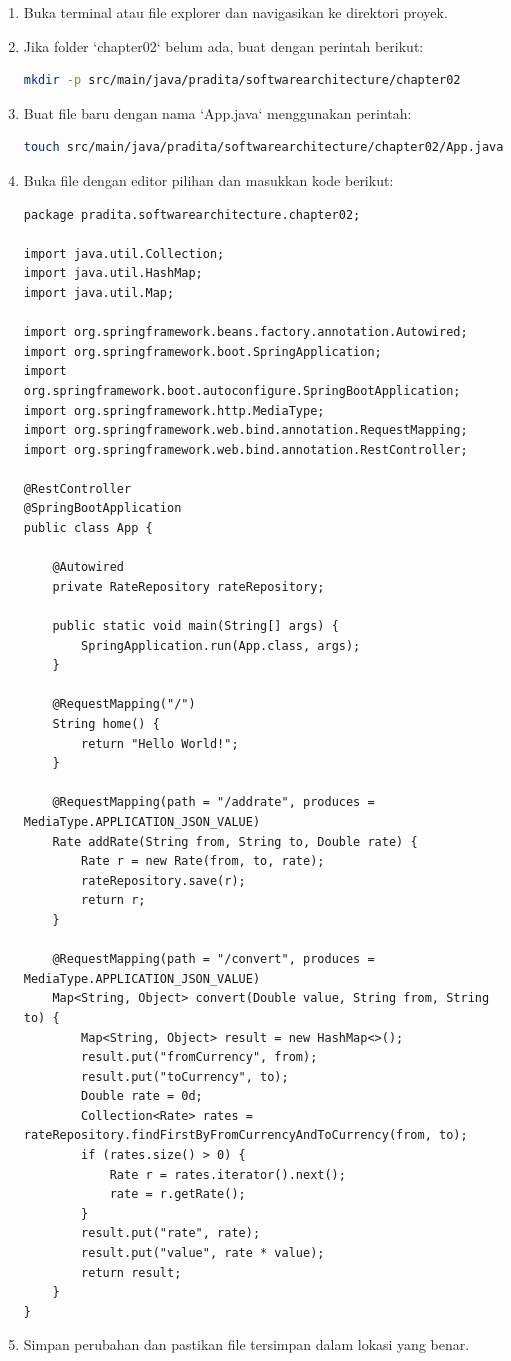 \begin{enumerate}
\item Buka terminal atau file explorer dan navigasikan ke direktori proyek.
\item Jika folder `chapter02` belum ada, buat dengan perintah berikut:

\begin{lstlisting}[language=bash]
mkdir -p src/main/java/pradita/softwarearchitecture/chapter02
\end{lstlisting}

\item Buat file baru dengan nama `App.java` menggunakan perintah:

\begin{lstlisting}[language=bash]
touch src/main/java/pradita/softwarearchitecture/chapter02/App.java
\end{lstlisting}

\item Buka file dengan editor pilihan dan masukkan kode berikut:

\begin{lstlisting}[style=JavaStyle]
package pradita.softwarearchitecture.chapter02;

import java.util.Collection;
import java.util.HashMap;
import java.util.Map;

import org.springframework.beans.factory.annotation.Autowired;
import org.springframework.boot.SpringApplication;
import org.springframework.boot.autoconfigure.SpringBootApplication;
import org.springframework.http.MediaType;
import org.springframework.web.bind.annotation.RequestMapping;
import org.springframework.web.bind.annotation.RestController;

@RestController
@SpringBootApplication
public class App {
	
	@Autowired
	private RateRepository rateRepository;
	
	public static void main(String[] args) {
		SpringApplication.run(App.class, args);
	}
	
	@RequestMapping("/")
	String home() {
		return "Hello World!";
	}
	
	@RequestMapping(path = "/addrate", produces = MediaType.APPLICATION_JSON_VALUE)
	Rate addRate(String from, String to, Double rate) {
		Rate r = new Rate(from, to, rate);
		rateRepository.save(r);
		return r;
	}
	
	@RequestMapping(path = "/convert", produces = MediaType.APPLICATION_JSON_VALUE)
	Map<String, Object> convert(Double value, String from, String to) {
		Map<String, Object> result = new HashMap<>();
		result.put("fromCurrency", from);
		result.put("toCurrency", to);
		Double rate = 0d;
		Collection<Rate> rates = rateRepository.findFirstByFromCurrencyAndToCurrency(from, to);
		if (rates.size() > 0) {
			Rate r = rates.iterator().next();
			rate = r.getRate();
		}
		result.put("rate", rate);
		result.put("value", rate * value);
		return result;
	}
}
\end{lstlisting}

\item Simpan perubahan dan pastikan file tersimpan dalam lokasi yang benar.
\end{enumerate}

